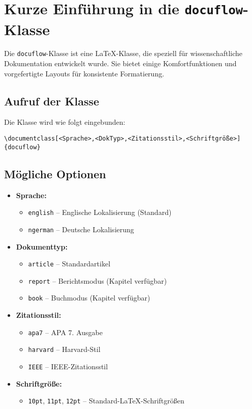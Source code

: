 
\section{Kurze Einführung in die \texttt{docuflow}-Klasse}

Die \texttt{docuflow}-Klasse ist eine LaTeX-Klasse, die speziell für wissenschaftliche Dokumentation entwickelt wurde. 
Sie bietet einige Komfortfunktionen und vorgefertigte Layouts für konsistente Formatierung.

\subsection{Aufruf der Klasse}

Die Klasse wird wie folgt eingebunden:

\begin{verbatim}
\documentclass[<Sprache>,<DokTyp>,<Zitationsstil>,<Schriftgröße>]{docuflow}
\end{verbatim}

\subsection{Mögliche Optionen}

\begin{itemize}
    \item \textbf{Sprache:} 
    \begin{itemize}
        \item \texttt{english} – Englische Lokalisierung (Standard)
        \item \texttt{ngerman} – Deutsche Lokalisierung
    \end{itemize}
    \item \textbf{Dokumenttyp:} 
    \begin{itemize}
        \item \texttt{article} – Standardartikel
        \item \texttt{report} – Berichtsmodus (Kapitel verfügbar)
        \item \texttt{book} – Buchmodus (Kapitel verfügbar)
    \end{itemize}
    \item \textbf{Zitationsstil:} 
    \begin{itemize}
        \item \texttt{apa7} – APA 7. Ausgabe
        \item \texttt{harvard} – Harvard-Stil
        \item \texttt{IEEE} – IEEE-Zitationsstil
    \end{itemize}
    \item \textbf{Schriftgröße:} 
    \begin{itemize}
        \item \texttt{10pt}, \texttt{11pt}, \texttt{12pt} – Standard-LaTeX-Schriftgrößen
    \end{itemize}
\end{itemize}


